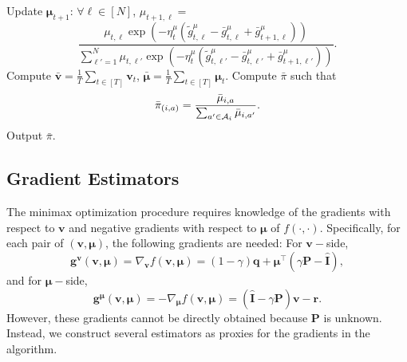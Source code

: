 \documentclass[12pt]{article}
\begin{document}
\begin{algorithm}[htb]
\begin{algorithmic}[1]
\begin{equation}
       \end{equation}
       \State Update $\boldsymbol{\mu}_{t+1}$: $\forall \ell \in [N]$, $\mu_{t+1,\ell} =$
       \begin{equation}
           \frac{\mu_{t,\ell} \exp(-\eta_t^{\mu}(\tilde{g}_{t,\ell}^{\mu} - \bar{g}_{t,\ell}^{\mu}+\bar{g}_{t+1,\ell}^{\mu}))}{\sum_{\ell' = 1}^{N} \mu_{t,\ell'} \exp(-\eta_t^{\mu}(\tilde{g}_{t,\ell'}^{\mu} - \bar{g}_{t,\ell'}^{\mu}+\bar{g}_{t+1,\ell'}^{\mu}))}.
           \label{eq:smd-prediction-noupper-mu-update}
       \end{equation}
       \EndFor
       \State Compute $\bar{\boldsymbol{v}} = \frac{1}{T} \sum_{t \in [T]} \boldsymbol{v}_t$, $\bar{\boldsymbol{\mu}} = \frac{1}{T} \sum_{t \in [T]} \boldsymbol{\mu}_t$.
       \State Compute $\bar{\pi}$ such that
       \begin{equation*}
           \bar{\pi}_{(i, a)} = \frac{\bar{\mu}_{i, a}}{\sum_{a'\in {\cal A}_i} \bar{\mu}_{i, a'}}.
       \end{equation*}
       \State Output $\bar{\pi}$.
	\end{algorithmic}
	\label{alg:minimax-mirror-noupper}
\end{algorithm}

\subsection{Gradient Estimators}

\label{sec:alg-noupper-gradient-estimators}

The minimax optimization procedure requires knowledge of the gradients with respect to $\boldsymbol{v}$ and negative gradients with respect to $\boldsymbol{\mu}$ of $f(\cdot,\cdot)$. Specifically, for each pair of $(\boldsymbol{v},\boldsymbol{\mu})$, the following gradients are needed: For $\boldsymbol{v}-$side,
\begin{equation*}
    \boldsymbol{g}^{\boldsymbol{v}}(\boldsymbol{v},\boldsymbol{\mu}) = \nabla_{\boldsymbol{v}} f(\boldsymbol{v},\boldsymbol{\mu})=(1-\gamma) \boldsymbol{q} + \boldsymbol{\mu}^{\top} (\gamma \boldsymbol{\text{P}} - \hat{\boldsymbol{\text{I}}}),
\end{equation*}
and for $\boldsymbol{\mu}-$side,
\begin{equation*}
    \boldsymbol{g}^{\boldsymbol{\mu}}(\boldsymbol{v},\boldsymbol{\mu}) = - \nabla_{\boldsymbol{\mu}} f(\boldsymbol{v},\boldsymbol{\mu})= (\hat{\boldsymbol{\text{I}}} - \gamma \boldsymbol{\text{P}}) \boldsymbol{v} - \boldsymbol{\text{r}}.
\end{equation*}
However, these gradients cannot be directly obtained because $\boldsymbol{\text{P}}$ is unknown. Instead, we construct several estimators as proxies for the gradients in the algorithm.
\end{document}
